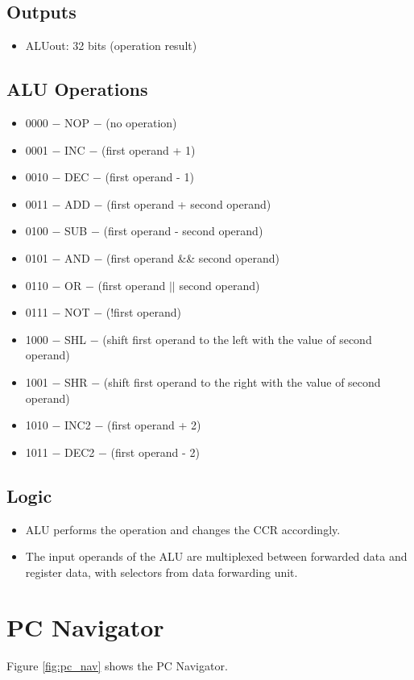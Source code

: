 \subsection{Outputs}
\begin{itemize}
    \item ALUout: 32 bits (operation result)
\end{itemize}

\subsection{ALU Operations}
\begin{itemize}
    \item 0000 $-$ NOP $-$ (no operation)
    \item 0001 $-$ INC $-$ (first operand + 1)
    \item 0010 $-$ DEC $-$ (first operand - 1)
    \item 0011 $-$ ADD $-$ (first operand + second operand)
    \item 0100 $-$ SUB $-$ (first operand - second operand)
    \item 0101 $-$ AND $-$ (first operand \&\& second operand)
    \item 0110 $-$ OR $-$ (first operand $||$ second operand)
    \item 0111 $-$ NOT $-$ (!first operand)
    \item 1000 $-$ SHL $-$ (shift first operand to the left with the value of second operand)
    \item 1001 $-$ SHR $-$ (shift first operand to the right with the value of second operand)
    \item 1010 $-$ INC2 $-$ (first operand + 2)
    \item 1011 $-$ DEC2 $-$ (first operand - 2)
\end{itemize}

\subsection{Logic}
\begin{itemize}
    \item ALU performs the operation and changes the CCR accordingly.
    \item The input operands of the ALU are multiplexed between forwarded data and register data, with selectors from data forwarding unit.
\end{itemize}


\section{PC Navigator}
Figure \ref{fig:pc_nav} shows the PC Navigator.

